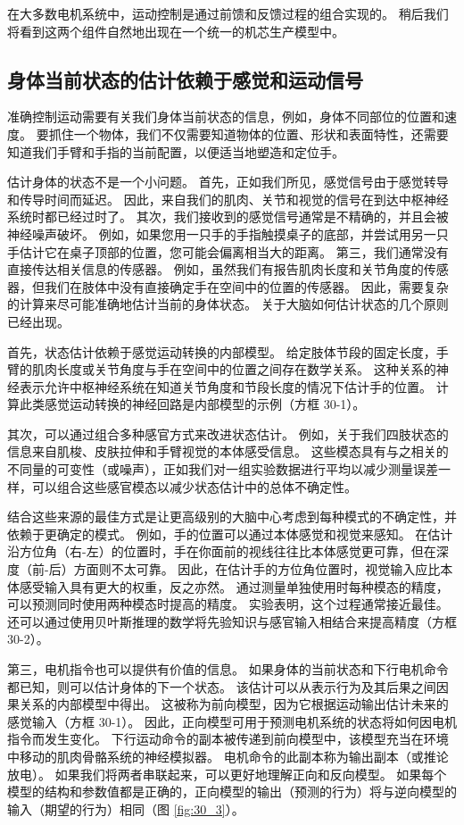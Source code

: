在大多数电机系统中，运动控制是通过前馈和反馈过程的组合实现的。
稍后我们将看到这两个组件自然地出现在一个统一的机芯生产模型中。



\subsection{身体当前状态的估计依赖于感觉和运动信号}

准确控制运动需要有关我们身体当前状态的信息，例如，身体不同部位的位置和速度。
要抓住一个物体，我们不仅需要知道物体的位置、形状和表面特性，还需要知道我们手臂和手指的当前配置，以便适当地塑造和定位手。


估计身体的状态不是一个小问题。
首先，正如我们所见，感觉信号由于感觉转导和传导时间而延迟。
因此，来自我们的肌肉、关节和视觉的信号在到达中枢神经系统时都已经过时了。
其次，我们接收到的感觉信号通常是不精确的，并且会被神经噪声破坏。
例如，如果您用一只手的手指触摸桌子的底部，并尝试用另一只手估计它在桌子顶部的位置，您可能会偏离相当大的距离。
第三，我们通常没有直接传达相关信息的传感器。
例如，虽然我们有报告肌肉长度和关节角度的传感器，但我们在肢体中没有直接确定手在空间中的位置的传感器。
因此，需要复杂的计算来尽可能准确地估计当前的身体状态。
关于大脑如何估计状态的几个原则已经出现。


首先，状态估计依赖于感觉运动转换的内部模型。
给定肢体节段的固定长度，手臂的肌肉长度或关节角度与手在空间中的位置之间存在数学关系。
这种关系的神经表示允许中枢神经系统在知道关节角度和节段长度的情况下估计手的位置。
计算此类感觉运动转换的神经回路是内部模型的示例（方框 30-1）。


其次，可以通过组合多种感官方式来改进状态估计。
例如，关于我们四肢状态的信息来自肌梭、皮肤拉伸和手臂视觉的本体感受信息。
这些模态具有与之相关的不同量的可变性（或噪声），正如我们对一组实验数据进行平均以减少测量误差一样，可以组合这些感官模态以减少状态估计中的总体不确定性。


结合这些来源的最佳方式是让更高级别的大脑中心考虑到每种模式的不确定性，并依赖于更确定的模式。
例如，手的位置可以通过本体感觉和视觉来感知。
在估计沿方位角（右-左）的位置时，手在你面前的视线往往比本体感觉更可靠，但在深度（前-后）方面则不太可靠。
因此，在估计手的方位角位置时，视觉输入应比本体感受输入具有更大的权重，反之亦然。
通过测量单独使用时每种模态的精度，可以预测同时使用两种模态时提高的精度。
实验表明，这个过程通常接近最佳。 还可以通过使用贝叶斯推理的数学将先验知识与感官输入相结合来提高精度（方框 30-2）。


第三，电机指令也可以提供有价值的信息。
如果身体的当前状态和下行电机命令都已知，则可以估计身体的下一个状态。
该估计可以从表示行为及其后果之间因果关系的内部模型中得出。
这被称为前向模型，因为它根据运动输出估计未来的感觉输入（方框 30-1）。
因此，正向模型可用于预测电机系统的状态将如何因电机指令而发生变化。
下行运动命令的副本被传递到前向模型中，该模型充当在环境中移动的肌肉骨骼系统的神经模拟器。
电机命令的此副本称为输出副本（或推论放电）。
如果我们将两者串联起来，可以更好地理解正向和反向模型。 
如果每个模型的结构和参数值都是正确的，正向模型的输出（预测的行为）将与逆向模型的输入（期望的行为）相同（图 \ref{fig:30_3}）。


